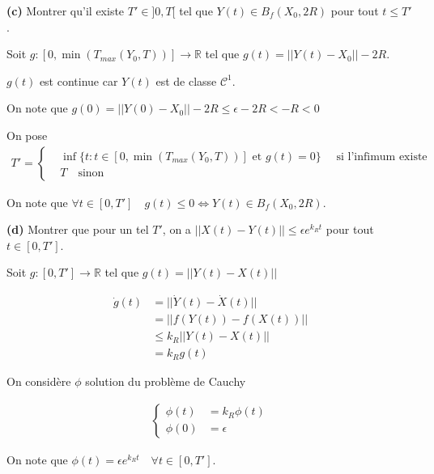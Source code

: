 \documentclass[french]{article}
\begin{document}
	\begin{tcolorbox}[colback=gray!5!white,colframe=gray!75!black]
		\textbf{\large{(c)}} Montrer qu'il existe $T' \in ]0, T[$ tel que $Y(t) \in B_f(X_0, 2R)$ pour tout $t \leq T'$.
	\end{tcolorbox}

	Soit $g: [0, \min(T_{max}(Y_0, T))] \to \mathbb{R}$ tel que  $g(t) = || Y(t) - X_0 || - 2R$.
	
	$g(t)$ est continue car $Y(t)$ est de classe $\mathcal{C}^1$.
	
	On note que $g(0) = ||Y(0) - X_0|| - 2R \leq \epsilon - 2R < -R < 0$
	
	On pose
	\begin{align}
	T' = 
		\begin{cases}
			&\inf \{ t : t \in [0, \min(T_{max}(Y_0, T))] \text{ et } g(t) = 0 \} \quad \text{ si l'infimum existe }\\
			&T \quad \text{sinon}
		\end{cases}
	\end{align}
	
	On note que $\forall t \in [0, T'] \quad g(t) \leq 0 \iff Y(t) \in B_f(X_0, 2R)$.
	

	\begin{tcolorbox}[colback=gray!5!white,colframe=gray!75!black]
		\textbf{\large{(d)}} Montrer que pour un tel $T'$, on a $|| X(t) - Y(t) || \leq \epsilon e^{k_Rt}$ pour tout $t \in [0, T']$.
	\end{tcolorbox}

	Soit $g : [0, T'] \to \mathbb{R}$ tel que $g(t) = || Y(t) - X(t) ||$

	\begin{align}
		\dot{g}(t) &= || \dot{Y}(t) - \dot{X}(t) ||\\
						 &= || f(Y(t)) - f(X(t)) ||\\
						 &\leq k_R || Y(t) - X(t) ||\\
						 &= k_Rg(t)
	\end{align}
	
	On considère $\phi$ solution du problème de Cauchy
	
	\begin{align}
		\begin{cases}
		\phi(t) &= k_R\phi(t)\\
		\phi(0) &= \epsilon
		\end{cases}
	\end{align}
	
	On note que $\phi(t) = \epsilon e^{k_Rt} \quad \forall t \in [0, T']$.
	
\end{document}
